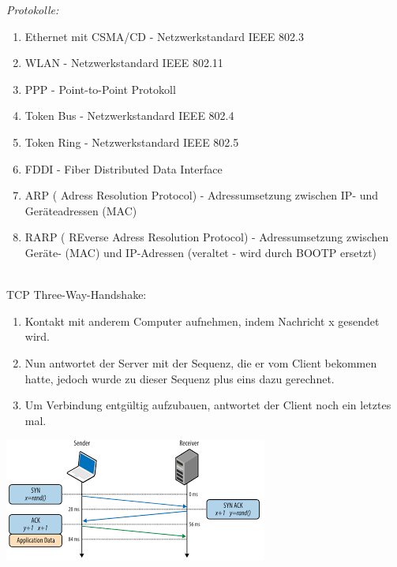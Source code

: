 \documentclass[11pt]{article}
\begin{document}
\begin{enumerate}[\thesection .1]
        \begin{addmargin}[1em]{1em}
            \emph{Protokolle:}\\
            \begin{enumerate}[$\diamond$]
                \item Ethernet mit CSMA/CD - Netzwerkstandard IEEE 802.3\\
                \item WLAN - Netzwerkstandard IEEE 802.11\\
                \item PPP - Point-to-Point Protokoll\\
                \item Token Bus - Netzwerkstandard IEEE 802.4\\
                \item Token Ring - Netzwerkstandard IEEE 802.5\\
                \item FDDI - Fiber Distributed Data Interface\\
                \item ARP ( Adress Resolution Protocol) - Adressumsetzung zwischen IP- und Geräteadressen (MAC)\\
                \item RARP ( REverse Adress Resolution Protocol) - Adressumsetzung zwischen Geräte- (MAC) und IP-Adressen
                (veraltet - wird durch BOOTP ersetzt)\\\\
            \end{enumerate}
        \end{addmargin}
    \end{enumerate}

    TCP Three-Way-Handshake:
    \begin{enumerate}
        \item Kontakt mit anderem Computer aufnehmen, indem Nachricht x gesendet wird.
        \item Nun antwortet der Server mit der Sequenz, die er vom Client bekommen hatte,
        jedoch wurde zu dieser Sequenz plus eins dazu gerechnet.
        \item Um Verbindung entgültig aufzubauen, antwortet der Client noch ein letztes mal.\\
    \end{enumerate}
    \includegraphics[width=\textwidth]{images.png}
\end{document}
